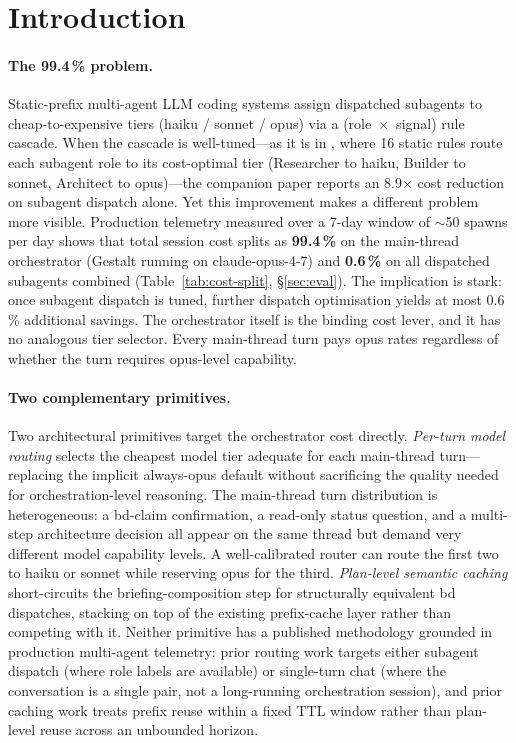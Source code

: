 \section{Introduction}
\label{sec:intro}

\paragraph{The 99.4\,\% problem.}
Static-prefix multi-agent LLM coding systems assign dispatched
subagents to cheap-to-expensive tiers (haiku / sonnet / opus) via
a (role~\(\times\)~signal) rule cascade. When the cascade is
well-tuned---as it is in \blackrim, where 16 static rules route
each subagent role to its cost-optimal tier (Researcher to haiku,
Builder to sonnet, Architect to opus)---the companion paper
\cite{moa1landscape} reports an 8.9\(\times\) cost reduction on
subagent dispatch alone. Yet this improvement makes a different
problem more visible. Production telemetry measured over a 7-day
window of \(\sim\)50 spawns per day shows that total session cost
splits as \textbf{99.4\,\%} on the main-thread orchestrator
(Gestalt running on claude-opus-4-7) and \textbf{0.6\,\%} on all
dispatched subagents combined (Table~\ref{tab:cost-split},
\S\ref{sec:eval}). The implication is stark: once subagent
dispatch is tuned, further dispatch optimisation yields at most
0.6\,\% additional savings. The orchestrator itself is the
binding cost lever, and it has no analogous tier selector. Every
main-thread turn pays opus rates regardless of whether the turn
requires opus-level capability.

\paragraph{Two complementary primitives.}
Two architectural primitives target the orchestrator cost directly.
\emph{Per-turn model routing} selects the cheapest model tier
adequate for each main-thread turn---replacing the implicit
always-opus default without sacrificing the quality needed for
orchestration-level reasoning. The main-thread turn distribution
is heterogeneous: a bd-claim confirmation, a read-only status
question, and a multi-step architecture decision all appear on
the same thread but demand very different model capability levels.
A well-calibrated router can route the first two to haiku or
sonnet while reserving opus for the third.
\emph{Plan-level semantic caching} short-circuits the briefing-composition
step for structurally equivalent bd dispatches, stacking on top
of the existing prefix-cache layer rather than competing with it.
Neither primitive has a published methodology grounded in
production multi-agent telemetry: prior routing work targets
either subagent dispatch (where role labels are available) or
single-turn chat (where the conversation is a single pair, not
a long-running orchestration session), and prior caching work
treats prefix reuse within a fixed TTL window rather than
plan-level reuse across an unbounded horizon.

